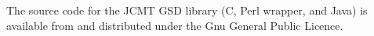 \documentclass[final,authoryear,5p,times,twocolumn]{elsarticle}
\begin{document}
The source code for the JCMT GSD library (C, Perl wrapper, and Java)
is available from
and distributed under the Gnu General Public Licence.








\end{document}
